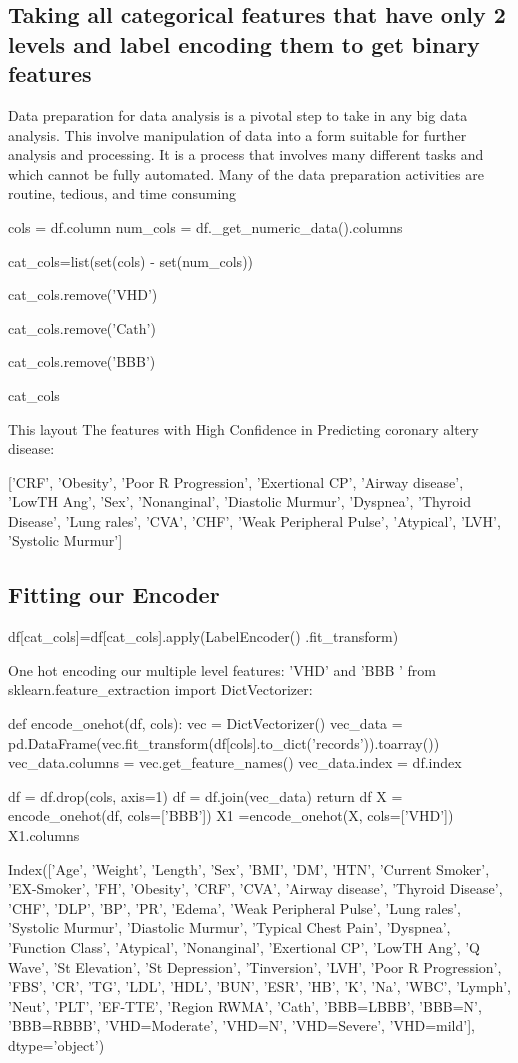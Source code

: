 \documentclass[sigconf]{acmart}
\begin{document}
\subsection{Taking all categorical features that have only 2 levels and label encoding them to get binary features}

Data preparation for data analysis is a pivotal step to take in any big data analysis. This involve manipulation of data into a form suitable for further analysis and processing. It is a process that involves many different tasks and which cannot be fully automated. Many of the data preparation activities are routine, tedious, and time consuming

cols = df.column
num_cols = df._get_numeric_data().columns

cat_cols=list(set(cols) - set(num_cols))

cat_cols.remove('VHD')

cat_cols.remove('Cath')

cat_cols.remove('BBB')

cat_cols

This layout The features with High Confidence in Predicting coronary altery disease:


['CRF',
    'Obesity',
    'Poor R Progression',
    'Exertional CP',
    'Airway disease',
    'LowTH Ang',
    'Sex',
    'Nonanginal',
    'Diastolic Murmur',
    'Dyspnea',
    'Thyroid Disease',
   'Lung rales',
    'CVA',
    'CHF',
    'Weak Peripheral Pulse',
    'Atypical',
    'LVH',
    'Systolic Murmur']
\subsection{Fitting our Encoder}

df[cat_cols]=df[cat_cols].apply(LabelEncoder()
.fit_transform)

One hot encoding our multiple level features: 'VHD' and 'BBB
'
from sklearn.feature_extraction import DictVectorizer:


def encode_onehot(df, cols):
vec = DictVectorizer()
vec_data = pd.DataFrame(vec.fit_transform(df[cols].to_dict('records')).toarray())
vec_data.columns = vec.get_feature_names()
vec_data.index = df.index
    
df = df.drop(cols, axis=1)
df = df.join(vec_data)
return df
X = encode_onehot(df, cols=['BBB'])
X1 =encode_onehot(X, cols=['VHD'])
X1.columns

Index(['Age', 'Weight', 'Length', 'Sex', 'BMI', 'DM', 'HTN', 'Current Smoker',
       'EX-Smoker', 'FH', 'Obesity', 'CRF', 'CVA', 'Airway disease',
       'Thyroid Disease', 'CHF', 'DLP', 'BP', 'PR', 'Edema',
       'Weak Peripheral Pulse', 'Lung rales', 'Systolic Murmur',
       'Diastolic Murmur', 'Typical Chest Pain', 'Dyspnea', 'Function Class',
       'Atypical', 'Nonanginal', 'Exertional CP', 'LowTH Ang', 'Q Wave',
       'St Elevation', 'St Depression', 'Tinversion', 'LVH',
       'Poor R Progression', 'FBS', 'CR', 'TG', 'LDL', 'HDL', 'BUN', 'ESR',
       'HB', 'K', 'Na', 'WBC', 'Lymph', 'Neut', 'PLT', 'EF-TTE', 'Region RWMA',
       'Cath', 'BBB=LBBB', 'BBB=N', 'BBB=RBBB', 'VHD=Moderate', 'VHD=N',
       'VHD=Severe', 'VHD=mild'],
        dtype='object')
\end{document}
